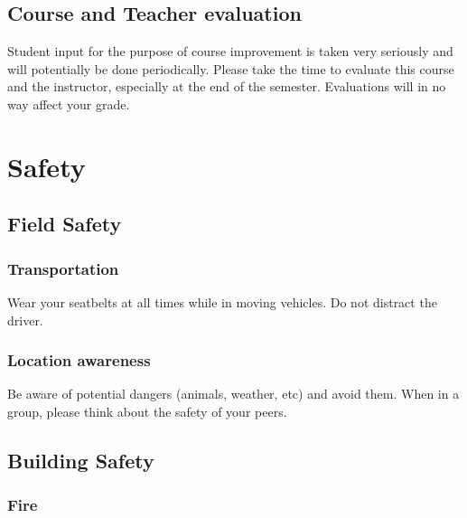 \documentclass[11pt,]{article}
\begin{document}
\hypertarget{course-and-teacher-evaluation}{%
\subsection{Course and Teacher
evaluation}\label{course-and-teacher-evaluation}}

Student input for the purpose of course improvement is taken very
seriously and will potentially be done periodically. Please take the
time to evaluate this course and the instructor, especially at the end
of the semester. Evaluations will in no way affect your grade.

\newpage

\hypertarget{safety}{%
\section{Safety}\label{safety}}

\hypertarget{field-safety}{%
\subsection{Field Safety}\label{field-safety}}

\hypertarget{transportation}{%
\subsubsection{Transportation}\label{transportation}}

Wear your seatbelts at all times while in moving vehicles. Do not
distract the driver.

\hypertarget{location-awareness}{%
\subsubsection{Location awareness}\label{location-awareness}}

Be aware of potential dangers (animals, weather, etc) and avoid them.
When in a group, please think about the safety of your peers.

\hypertarget{building-safety}{%
\subsection{Building Safety}\label{building-safety}}

\hypertarget{fire}{%
\subsubsection{Fire}\label{fire}}
\end{document}
